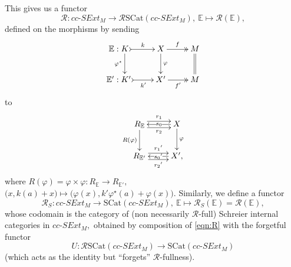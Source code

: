 \documentclass[a4paper]{amsart}
\theoremstyle{plain}
\theoremstyle{definition}
\theoremstyle{remark}
\begin{document}
This gives us a functor
\begin{equation}
\label{eqn:R}
\mathcal{R}\colon cc\text{-}SExt_M\longrightarrow\mathcal{R}\mathrm{SCat}(cc\text{-}SExt_M), \ \mathbb{E} \mapsto \mathcal{R}(\mathbb{E}),
\end{equation}
defined on the morphisms by sending
\begin{equation*}
\xymatrix{
{\mathbb{E}:K} \ar@<1.7ex>[d]_-{\varphi^\star} \ar@{>->}[r]^-k &X \ar[d]^-{\varphi} \ar@{->>}[r]^-f &M \ar@{=}[d]\\
{\mathbb{E}^\prime:K^\prime} \ar@{>->}[r]_-{k^\prime} &{X^\prime} \ar@{->>}[r]_-{f^\prime} &{M}
}
\end{equation*}
to
\begin{equation*}
\xymatrix{
{R_{\mathbb{E}}}\ar@<.9ex>[r]^-{r_1} \ar@<-.9ex>[r]_-{r_2} \ar[d]_-{R(\varphi)} &{X} \ar[d]^-{\varphi} \ar[l]|-{s_0} \\
{R_{\mathbb{E}'}}\ar@<.9ex>[r]^-{{r_1}^\prime} \ar@<-.9ex>[r]_-{{r_2}^\prime} &{X^\prime,} \ar[l]|-{{s_0}^\prime}
}
\end{equation*}
where $R(\varphi)=\varphi\times\varphi\colon R_{\mathbb{E}}\longrightarrow R_{\mathbb{E}'},$ $\big(x,k(a)+x\big)\longmapsto\big(\varphi(x),k'\varphi^\star(a)+\varphi(x)\big).$ Similarly, we define a functor
\[\mathcal{R}_S\colon cc\text{-}SExt_M\longrightarrow\mathrm{SCat}(cc\text{-}SExt_M), \ \mathbb{E} \mapsto \mathcal{R}_S(\mathbb{E})=\mathcal{R}(\mathbb{E}),
\]
whose codomain is the category of (non necessarily $\mathcal{R}$-full) Schreier internal categories in $cc\text{-}SExt_M,$ obtained by composition of \eqref{eqn:R} with the forgetful functor
\begin{equation*}
U\colon\mathcal{R}\mathrm{SCat}(cc\text{-}SExt_M)\longrightarrow\mathrm{SCat}(cc\text{-}SExt_M)
\end{equation*}
(which acts as the identity but ``forgets'' $\mathcal{R}$-fullness).
\end{document}
